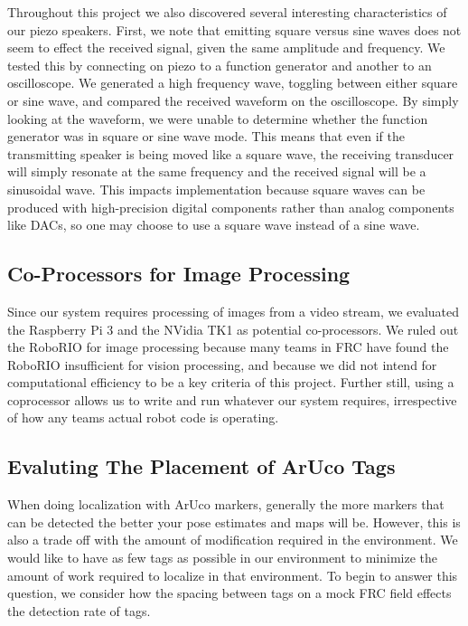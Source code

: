 \documentclass{article}
\begin{document}
    Throughout this project we also discovered several interesting characteristics of our piezo speakers. First, we note that emitting square versus sine waves does not seem to effect the received signal, given the same amplitude and frequency. We tested this by connecting on piezo to a function generator and another to an oscilloscope. We generated a high frequency wave, toggling between either square or sine wave, and compared the received waveform on the oscilloscope. By simply looking at the waveform, we were unable to determine whether the function generator was in square or sine wave mode. This means that even if the transmitting speaker is being moved like a square wave, the receiving transducer will simply resonate at the same frequency and the received signal will be a sinusoidal wave. This impacts implementation because square waves can be produced with high-precision digital components rather than analog components like DACs, so one may choose to use a square wave instead of a sine wave.

	\subsection{Co-Processors for Image Processing}

    Since our system requires processing of images from a video stream, we evaluated the Raspberry Pi 3 and the NVidia TK1 as potential co-processors. We ruled out the RoboRIO for image processing because many teams in FRC have found the RoboRIO insufficient for vision processing, and because we did not intend for computational efficiency to be a key criteria of this project. Further still, using a coprocessor allows us to write and run whatever our system requires, irrespective of how any teams actual robot code is operating.


  \subsection{Evaluting The Placement of ArUco Tags} \label{section:tag_placement}

    When doing localization with ArUco markers, generally the more markers that can be detected the better your pose estimates and maps will be. However, this is also a trade off with the amount of modification required in the environment. We would like to have as few tags as possible in our environment to minimize the amount of work required to localize in that environment. To begin to answer this question, we consider how the spacing between tags on a mock FRC field effects the detection rate of tags.
\end{document}
